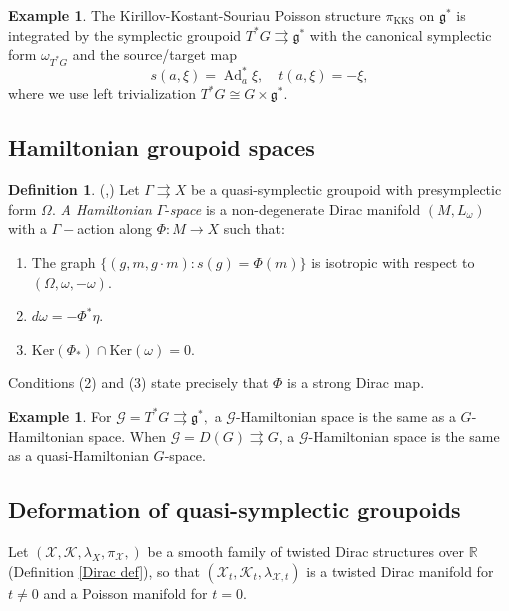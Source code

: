 \documentclass[reqno]{amsart}
\theoremstyle{plain}
\theoremstyle{definition}
\newtheorem{Def}[Thm]{Definition}
\newtheorem{Exp}[Thm]{Example}
\newcommand{\R}{\mathbb{R}}
\newcommand{\G}{\mathcal{G}}
\newcommand{\g}{\mathfrak{g}}
\newcommand{\too}{\longrightarrow}
\newcommand{\Ad}{\operatorname{Ad}}
\newcommand{\X}{\mathcal{X}}
\newcommand{\Ker}{\text{Ker}}
\newcommand{\K}{\mathcal{K}}
\begin{document}
\begin{Exp}
The Kirillov-Kostant-Souriau Poisson structure $\pi_{\text{KKS}}$ on $\g^{*}$ is integrated by the symplectic groupoid $T^{*}G \rightrightarrows \g^{*}$ with the canonical symplectic form $\omega_{T^{*}G}$ and the source/target map 
\[
s(a,\xi) = \Ad_{a}^{*}\xi, \quad t(a,\xi) = -\xi,    
\] 
where we use left trivialization $T^{*}G \cong G\times \g^{*}.$
\end{Exp}

\subsection{Hamiltonian groupoid spaces}
\begin{Def}(\cite{xu2004momentum},\cite[]{bualibanu2026reduction}) \label{def:ham} 
Let $\Gamma \rightrightarrows X$ be a quasi-symplectic groupoid with presymplectic form $\Omega.$ \textit{A Hamiltonian} $\Gamma$-\textit{space} is a non-degenerate Dirac manifold $(M,L_{\omega})$ with a $\Gamma-$action along $\Phi: M\too X$ such that: \begin{enumerate}
    \item The graph $\{(g,m,g\cdot m): s(g) = \Phi(m)\}$ is isotropic with respect to $(\Omega,\omega,-\omega).$ 
    \item $d\omega = -\Phi^{*}\eta.$
    \item $\Ker(\Phi_{*}) \cap \Ker(\omega) = 0.$
\end{enumerate}
Conditions (2) and (3) state precisely that $\Phi$ is a strong Dirac map.    
\end{Def}

\begin{Exp}
For $\G = T^{*}G \rightrightarrows \g^{*},$ a $\G$-Hamiltonian space is the same as a $G$-Hamiltonian space. When $\G = D(G) \rightrightarrows G$, a $\G$-Hamiltonian space is the same as a quasi-Hamiltonian $G$-space.
\end{Exp}

\subsection{Deformation of quasi-symplectic groupoids}
Let $(\X,\K,\lambda_{X},\pi_{\X},)$ be a smooth family of twisted Dirac structures over $\R$ (Definition \ref{Dirac def}), so that $(\X_t,\K_t,\lambda_{\X,t})$ is a twisted Dirac manifold for $t\neq 0$ and a Poisson manifold for $t = 0.$
\end{document}
